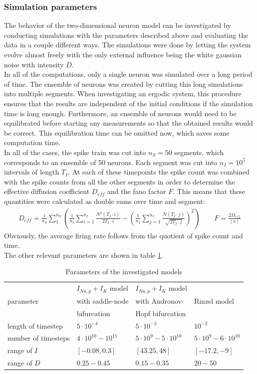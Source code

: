 \documentclass[12pt,a4paper]{article}
\begin{document}
\subsubsection{Simulation parameters}
The behavior of the two-dimensional neuron model can be investigated by conducting simulations with the parameters described above and evaluating the data in a couple different ways. The simulations were done by letting the system evolve almost freely with the only external influence being the white gaussian noise with intensity $D$. \\
In all of the computations, only a single neuron was simulated over a long period of time. The ensemble of neurons was created by cutting this long simulations into multiple segments. When investigating an ergodic system, this procedure ensures that the results are independent of the initial conditions if the simulation time is long enough. Furthermore, an ensemble of neurons would need to be equilibrated before starting any measurements so that the obtained results would be correct. This equilibration time can be omitted now, which saves some computation time. \\
In all of the cases, the spike train was cut into $n_S=50$ segments, which corresponds to an ensemble of 50 neurons. Each segment was cut into $n_I=10^5$ intervals of length $T_I$. At each of these timepoints the spike count was combined with the spike counts from all the other segments in order to determine the effective diffusion coefficient $D_{eff}$ and the fano factor $F$. This means that these quantities were calculated as double sums over time and segment:
\begin{align*}
D_{eff}=\frac{1}{n_S}\sum_{1}^{n_S}\left(\frac{1}{n_I}\sum_{i=1}^{n_I}\frac{N^2(T_I\cdot i)}{2T_I\cdot i}-\left(\frac{1}{n_I}\sum_{j=1}^{n_I}\frac{N(T_I\cdot j)}{\sqrt{2T_I\cdot j}}\right)^2\right)\qquad F=\frac{2D_{eff}}{\left<v\right>}
\end{align*}
Obviously, the average firing rate follows from the quotient of spike count and time.\\
The other relevant parameters are shown in table \ref{params}.
\begin{table}[h]

\begin{tabular}{|l|l|l|l|}
	\hline
	 & $I_{Na,p}+I_K$ model  & $I_{Na,p}+I_K$ model & \\ parameter &  with saddle-node & with Andronov- &Rinzel model\\ & bifurcation & Hopf bifurcation &\\
	\hline
	length of timestep&$5\cdot 10^{-4}$&$5\cdot10^{-3}$&$10^{-2}$\\\hline
	number of timesteps&$4\cdot10^{10}-10^{11}$&$5\cdot10^9-5\cdot10^{10}$&$5\cdot10^9-6\cdot10^{10}$\\\hline
	range of $I$&$[-0.08,0.3]$&$[43.25,48]$&$[-17.2,-9]$\\\hline
	range of $D$&$0.25-0.45$&$0.15-0.35$&$20-50$\\
	\hline
\end{tabular}
\caption{Parameters of the investigated models}	
\label{params}
\end{table}
\end{document}
